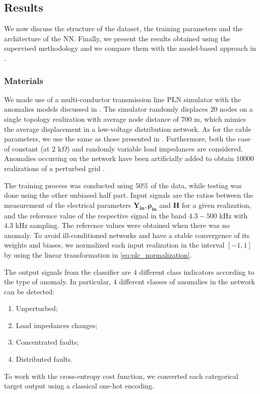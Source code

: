 \subsection{Results}
\label{subsec:plc_anomaly_results}
We now discuss the structure of the dataset, the training parameters and the architecture of the NN. Finally, we present the results obtained using the supervised methodology and we compare them with the model-based approach in \cite{8641473}.

\subsubsection{Materials}
\label{subsec:plc_materials}
We made use of a multi-conductor transmission line PLN simulator with the anomalies models discussed in \cite{8653266}. The simulator randomly displaces $20$ nodes on a single topology realization with average node distance of $700$ m, which mimics the average displacement in a low-voltage distribution network.
As for the cable parameters, we use the same as those presented in \cite{versolatto2011an}.
Furthermore, both the case of constant (at $2$ k$\Omega$) and randomly variable load impedances are considered.
Anomalies occurring on the network have been artificially added
to obtain $10000$ realizations of a perturbed grid \cite{8653266}. 

The training process was conducted using $50\%$ of the data, while testing was done using the other unbiased half part. 
Input signals are the ratios between the measurement of the electrical parameters $\mathbf{Y_{\text{in}}}, \mathbf{\rho_{\text{in}}}$ and $\mathbf{H}$ for a given realization, and the reference value of the respective signal in the band $4.3-500$ kHz with $4.3$ kHz sampling. The reference values were obtained when there was no anomaly. To avoid ill-conditioned networks and have a stable convergence of its weights and biases, we normalized each input realization in the interval $[-1,1]$ by using the linear transformation in \eqref{eq:plc_normalization}.

The output signals from the classifier are $4$ different class indicators according to the type of anomaly. In particular, $4$ different classes of anomalies in the network can be detected:
\begin{enumerate}
\item Unperturbed;
\item Load impedances changes;
\item Concentrated faults;
\item Distributed faults.
\end{enumerate}
To work with the cross-entropy cost function, we converted each categorical target output using a classical one-hot encoding.

